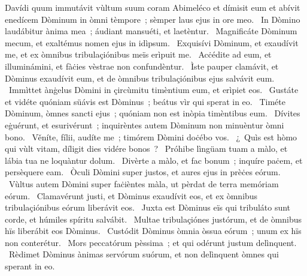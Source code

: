 { Davídi quum immutávit vùltum suum coram Abimeléco et dímisit eum et abívit}
{%
enedícem Dòminum in òmni tèmpore~; sèmper laus ejus in ore meo. 
~In Dòmino laudábitur ànima mea~; áudiant mansuéti, et laetèntur. 
~Magnificáte Dòminum mecum, et exaltémus nomen ejus in idìpsum. 
~Exquisívi Dòminum, et exaudívit me, et ex òmnibus tribulaçiónibus meïs erìpuit me. 
~Acċédite ad eum, et illuminámini, et fàċies vèstrae non confundèntur. 
~Ìste pauper clamávit, et Dòminus exaudívit eum, et de òmnibus tribulaçiónibus ejus salvávit eum. 
~Immìttet ànġelus Dòmini in çircùmitu timèntium eum, et erìpiet eos. 
~Gustáte et vidéte quóniam süávis est Dòminus~; beátus vìr qui sperat in eo. 
~Timéte Dòminum, òmnes sancti ejus~; quóniam non est inòpia timèntibus eum. 
~Dívites eġuérunt, et esurivérunt~; inquirèntes autem Dòminum non minuèntur òmni bono. 
~Věníte, fílii, audíte me~; timórem Dòmini doċébo vos. 
~¿~Quìs est hòmo qui vùlt vitam, díligit dies vidére bonos~? 
~Próhibe lìngüam tuam a màlo, et lábia tua ne loquàntur dolum. 
~Divèrte a màlo, et fac bonum~; inquíre paċem, et persèquere eam. 
~Òculi Dòmini super justos, et aures ejus in prèċes eórum. 
~Vùltus autem Dòmini super faċièntes màla, ut pèrdat de terra memóriam eórum. 
~Clamavérunt justi, et Dòminus exaudívit eos, et ex òmnibus tribulaçiónibus eórum liberávit eos. 
~Juxta est Dòminus eïs qui tribuláto sunt corde, et húmiles spíritu salvábit. 
~Multae tribulaçiónes justórum, et de òmnibus hïs liberábit eos Dòminus. 
~Custódit Dòminus òmnia òssua eórum~; unum ex hïs non conterétur. 
~Mors peccatórum pèssima~; et qui odérunt justum delìnquent. 
~Rèdimet Dòminus ànimas servórum suórum, et non delìnquent òmnes qui sperant in eo. 
}
